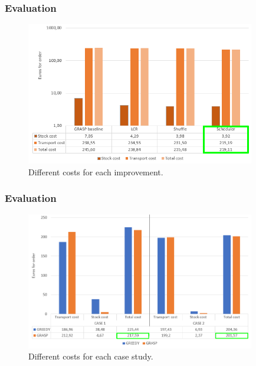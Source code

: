 \documentclass[t,compress,11pt,xcolor=dvipsnames,pdf,english]{beamer}
\begin{document}
\begin{frame}[c]{ }
    \frametitle{Evaluation}
    \begin{figure}[H]
        \centering
        \includegraphics[width=10cm]{img/comparisoncostIMPROV.png}
        \caption{Different costs for each improvement.}
    \end{figure}
\end{frame}

    
\begin{frame}[c]{ }
    \frametitle{Evaluation}
    \begin{figure}[H]
        \centering
        \includegraphics[width=10cm]{img/costcomparisionALGOTH.png}
        \caption{Different costs for each case study.}
    \end{figure}
\end{frame}
\end{document}
